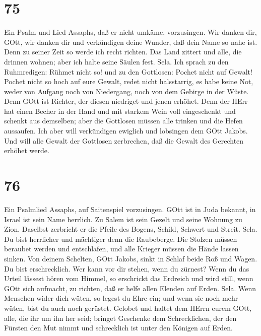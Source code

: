 \hypertarget{section-74}{%
\section{75}\label{section-74}}

 Ein Psalm und Lied Assaphs, daß er nicht umkäme,
vorzusingen.  Wir danken dir, GOtt, wir danken dir und
verkündigen deine Wunder, daß dein Name so nahe ist.  Denn
zu seiner Zeit so werde ich recht richten.  Das Land zittert
und alle, die drinnen wohnen; aber ich halte seine Säulen fest. Sela.
 Ich sprach zu den Ruhmredigen: Rühmet nicht so! und zu den
Gottlosen: Pochet nicht auf Gewalt!  Pochet nicht so hoch
auf eure Gewalt, redet nicht halsstarrig,  es habe keine
Not, weder von Aufgang noch von Niedergang, noch von dem Gebirge in der
Wüste.  Denn GOtt ist Richter, der diesen niedriget und
jenen erhöhet.  Denn der HErr hat einen Becher in der Hand
und mit starkem Wein voll eingeschenkt und schenkt aus demselben; aber
die Gottlosen müssen alle trinken und die Hefen aussaufen. 
Ich aber will verkündigen ewiglich und lobsingen dem GOtt Jakobs.
 Und will alle Gewalt der Gottlosen zerbrechen, daß die
Gewalt des Gerechten erhöhet werde.

\hypertarget{section-75}{%
\section{76}\label{section-75}}

 Ein Psalmlied Assaphs, auf Saitenspiel vorzusingen.
 GOtt ist in Juda bekannt, in Israel ist sein Name herrlich.
 Zu Salem ist sein Gezelt und seine Wohnung zu Zion.
 Daselbst zerbricht er die Pfeile des Bogens, Schild,
Schwert und Streit. Sela.  Du bist herrlicher und mächtiger
denn die Raubeberge.  Die Stolzen müssen beraubet werden und
entschlafen, und alle Krieger müssen die Hände lassen sinken.
 Von deinem Schelten, GOtt Jakobs, sinkt in Schlaf beide Roß
und Wagen.  Du bist erschrecklich. Wer kann vor dir stehen,
wenn du zürnest?  Wenn du das Urteil lässest hören vom
Himmel, so erschrickt das Erdreich und wird still,  wenn
GOtt sich aufmacht, zu richten, daß er helfe allen Elenden auf Erden.
Sela.  Wenn Menschen wider dich wüten, so legest du Ehre
ein; und wenn sie noch mehr wüten, bist du auch noch gerüstet.
 Gelobet und haltet dem HErrn eurem GOtt, alle, die ihr um
ihn her seid; bringet Geschenke dem Schrecklichen,  der den
Fürsten den Mut nimmt und schrecklich ist unter den Königen auf Erden.

